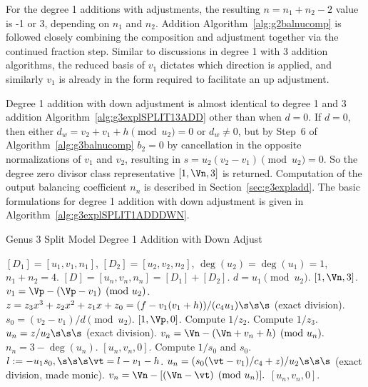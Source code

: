 For the degree 1 additions with adjustments, the resulting $n = n_1 + n_2 - 2$
value is -1 or 3, depending on $n_1$ and $n_2$. Addition
Algorithm~\ref{alg:g2balnucomp} is followed closely combining the composition
and adjustment together via the continued fraction step. Similar to discussions
in degree 1 with 3 addition algorithms, the reduced basis of $v_1$ dictates
which direction is applied, and similarly $v_1$ is already in the form required
to facilitate an up adjustment. 

Degree 1 addition with down adjustment is almost identical to degree 1 and 3
addition Algorithm~\ref{alg:g3explSPLIT13ADD} other than when $d = 0$. If $d=0$,
then either $d_w = v_2 + v_1 +h \pmod{u_2} = 0$ or $d_w \neq 0$, but by Step~6
of Algorithm~\ref{alg:g3balnucomp} $b_2 =0 $ by cancellation in the opposite
normalizations of $v_1$ and $v_2$, resulting in $s = u_2(v_2 - v_1) \pmod{u_2} =
0$. So the degree zero divisor class representative $[1,\Vn,3]$ is returned.
Computation of the output balancing coefficient $n_n$ is described in
Section~\ref{sec:g3expladd}. The basic formulations for degree 1 addition with
down adjustment is given in Algorithm~\ref{alg:g3explSPLIT1ADDDWN}.

\begin{algorithm}[H]
    \caption{Genus 3 Split Model Degree 1 Addition with Down Adjust\label{alg:g3explSPLIT1ADDDWN}}
    \begin{algorithmic} [1]
    \Require $[D_1] = [u_1,v_1,n_1]$, $[D_2] = [u_2,v_2,n_2]$, $\deg(u_2) = \deg(u_1) = 1$, $n_1 + n_2 = 4$.
    \Ensure $[D] = [u_n,v_n,n_n] = [D_1] + [D_2] $.
    \algrule
    \vspace{-2pt}
    \State $d = u_1 \pmod{u_2}$.
     \hspace{3pt} \Return $[1,\Vn, 3]$.
    \EndIf
    \State $v_1 = \Vp - (\Vp - v_1) \pmod{u_2}$.
    \State $z = z_3x^3 + z_2x^2 + z_1x + z_0 = (f - v_1(v_1 + h))/(c_4u_1) \s\s\s$ (exact division).  
    \State $s_0 = (v_2 - v_1)/d \pmod{u_2}$.
             \Return $[1,\Vp,0]$.
            \Else \hspace{3pt} Compute $1/z_2$.
            \EndIf
        \Else \hspace{3pt} Compute $1/z_3$.
        \EndIf
        \State $u_n = z/u_2 \s\s\s$ (exact division).
        \State $v_n = \Vn - (\Vn + v_n + h) \pmod{u_n}.$
        \State $n_n = 3 - \deg(u_n)$.
        \State \Return $[u_n,v_n,0]$.
    \EndIf
    \State Compute $1/s_0$ and $s_0$.
    \State $l := -u_1s_0, \s\s\s \vt = l - v_1 - h$.
    \State $u_n = (s_0(\vt - v_1)/c_4 + z)/u_2 \s\s\s$ (exact division, made monic).
    \State $v_n = \Vn - [(\Vn - \vt) \pmod{u_n}].$ 
    \State \Return $[u_n,v_n,0]$.
    \vspace{-2pt}
    \end{algorithmic}
    \end{algorithm}

